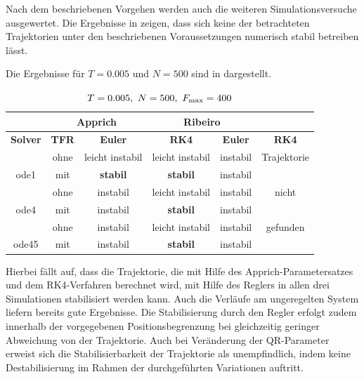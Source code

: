 Nach dem beschriebenen Vorgehen werden auch die weiteren Simulationsversuche ausgewertet. Die Ergebnisse in  zeigen, dass sich keine der betrachteten Trajektorien unter den beschriebenen Voraussetzungen numerisch stabil betreiben lässt.

Die Ergebnisse für $T=0.005$ und $N=500$ sind in  dargestellt.

\begin{table}[htbp]
	\centering
	\caption{$T=0.005, \ N=500, \ F_{\mrm{max}}=400$}
		\begin{tabular}{c|c|c|c|c|c}
			\rowcolor[gray]{0.9}
			\multicolumn{2}{c|}{\textbf{Simulation}} & \multicolumn{2}{c|}{\textbf{Apprich}} & \multicolumn{2}{c}{\textbf{Ribeiro}} \\
			\midrule
			\rowcolor[gray]{0.9}
			\textbf{Solver} & \textbf{TFR} & \textbf{Euler} & \textbf{RK4} & \textbf{Euler} & \textbf{RK4} \\
			\midrule
			\cellcolor[gray]{0.9}  											& \cellcolor[gray]{.9}ohne & leicht instabil  & leicht instabil & instabil & Trajektorie\\
			\multirow{-2}{*}{\cellcolor[gray]{.9}ode1}	& \cellcolor[gray]{.9}mit  & \textbf{stabil} & \textbf{stabil} 			& instabil 				 & 	\\
			\midrule
			\cellcolor[gray]{0.9}  											& \cellcolor[gray]{.9}ohne & instabil	& leicht instabil & instabil & nicht\\
			\multirow{-2}{*}{\cellcolor[gray]{.9}ode4}	& \cellcolor[gray]{.9}mit  & instabil & \textbf{stabil} & instabil & \\
			\midrule	
			\cellcolor[gray]{0.9}  											& \cellcolor[gray]{.9}ohne & instabil	&  leicht instabil & instabil 	& gefunden\\
			\multirow{-2}{*}{\cellcolor[gray]{.9}ode45}	& \cellcolor[gray]{.9}mit  & instabil	&  \textbf{stabil}  & instabil 	& \																											
		\end{tabular}
	\label{tab:T0005N500Fmax400}
\end{table}

Hierbei fällt auf, dass die Trajektorie, die mit Hilfe des Apprich-Parametersatzes und dem RK4-Verfahren berechnet wird, mit Hilfe des Reglers in allen drei Simulationen stabilisiert werden kann. Auch die Verläufe am ungeregelten System liefern bereits gute Ergebnisse. Die Stabilisierung durch den Regler erfolgt zudem innerhalb der vorgegebenen Positionsbegrenzung bei gleichzeitig geringer Abweichung von der Trajektorie. Auch bei Veränderung der QR-Parameter erweist sich die Stabilisierbarkeit der Trajektorie als unempfindlich, indem keine Destabilisierung im Rahmen der durchgeführten Variationen auftritt.

